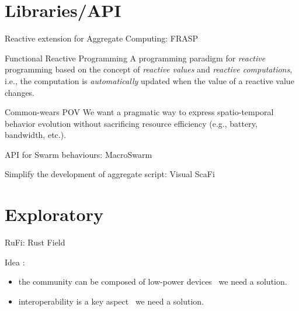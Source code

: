 \documentclass[presentation, 9pt, aspectratio=169]{beamer}\mode<presentation>{\usetheme{AMSBolognaFC}}
\begin{document}
\section{Libraries/API}
\begin{frame}{Reactive extension for Aggregate Computing: FRASP}
	\begin{alertblock}{Functional Reactive Programming}
		A programming paradigm for \emph{reactive} programming based on the concept of \emph{reactive values} and \emph{reactive computations}, i.e., the computation is \emph{automatically} updated when the value of a reactive value changes.
	\end{alertblock}
	\begin{exampleblock}{Common-wears POV}
		We want a pragmatic way to express spatio-temporal behavior evolution without sacrificing resource efficiency (e.g., battery, bandwidth, etc.).
	\end{exampleblock}

\end{frame}
\begin{frame}{API for Swarm behaviours: MacroSwarm}

\end{frame}
\begin{frame}{Simplify the development of aggregate script: Visual ScaFi}

\end{frame}
\section{Exploratory}
\begin{frame}{RuFi: Rust Field}
\begin{alertblock}{Idea}
	: \begin{itemize}
		\item the community can be composed of low-power devices \faArrowRight \, we need a  solution.
		\item interoperability is a key aspect \faArrowRight \, we need a  solution.
	\end{itemize}
\end{alertblock}
\end{frame}
\section{}

\end{document}
